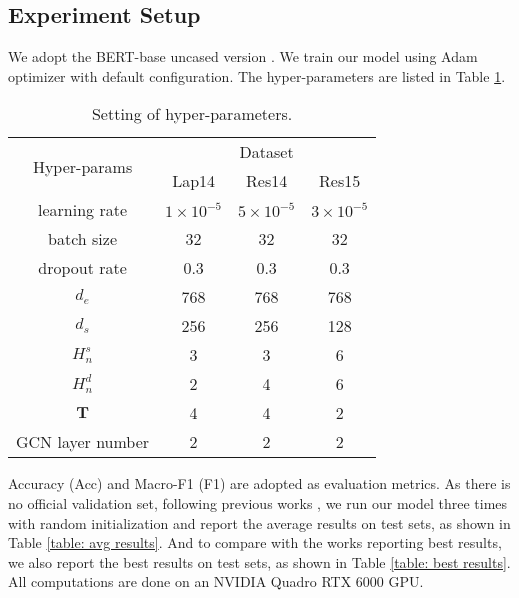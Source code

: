 \subsection{Experiment Setup}
We adopt the BERT-base uncased version \cite{bert}. We train our model using Adam optimizer \cite{Adam} with default configuration.
The hyper-parameters are listed in Table \ref{table: hyper-param}.
\begin{table}[t]
\fontsize{9}{11}\selectfont
\centering
\caption{Setting of hyper-parameters.}
\begin{tabular}{c|ccc}
\toprule
\multirow{2}{*}{Hyper-params} & \multicolumn{3}{c}{Dataset} \\\cline{2-4}
                              & Lap14   & Res14   & Res15   \\ \midrule
         learning rate        & $1\times 10^{-5}$  &   $5\times 10^{-5}$      & $3 \times 10^{-5}$        \\
          batch size          & 32     &   32    &   32    \\
            dropout rate     &  0.3    &    0.3  &   0.3   \\
           $d_e$              &  768    &  768    &  768   \\ 
$d_s$                 &  256     &    256     &   128      \\
$H_n^s$                 &  3     &   3     &     6    \\
$H_n^d$                &  2     &   4    &    6     \\
$\mathbf{T}$                 &   4    &      4   &    2    \\
GCN layer number             &   2      &    2     &   2      \\
           \bottomrule
\end{tabular}
\label{table: hyper-param}
\end{table}
Accuracy (Acc) and Macro-F1 (F1) are adopted as evaluation metrics.
As there is no official validation set, following previous works \cite{asgcn,bigcn,DGEDT}, we run our model three times with random initialization and report the average results on test sets, as shown in Table \ref{table: avg results}.
And to compare with the works reporting best results, we also report the best results on test sets, as shown in Table \ref{table: best results}.
All computations are done on an NVIDIA Quadro RTX 6000 GPU.

\begin{comment}
Besides standard KaGRMN-DSG (M$_0$), we also evaluate some variants (M$_{1}$\textasciitilde M$_4$) of M$_0$ to empirically verify its effectiveness from different perspectives.
M$_1$: DSG-Net is evaluated as a single model.
M$_2$: we replace the input description with the aspect so no aspect knowledge is leveraged.
M$_3$: KaGR-MN is evaluated as a single model.
M$_4$: KI Gate is removed.
\end{comment}
